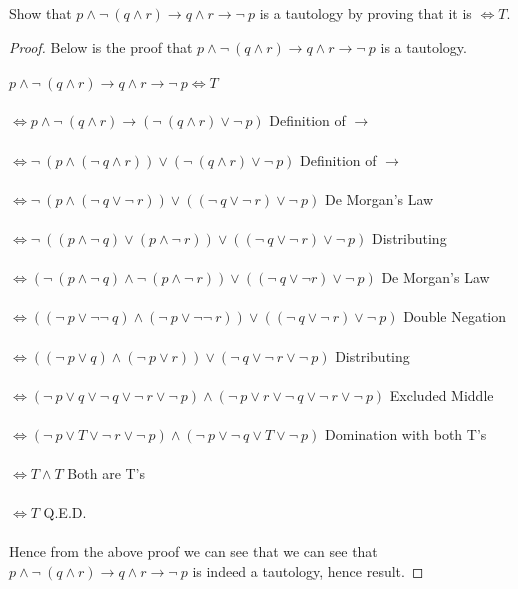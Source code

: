 \documentclass[12pt]{article}
\newenvironment{exercise}[2][Exercise]{\begin{trivlist}
\item[\hskip \labelsep {\bfseries #1}\hskip \labelsep {\bfseries #2.}]}{\end{trivlist}}
\begin{document}
\begin{exercise}{7}
Show that $p \land \neg\: (q \land r) \rightarrow q \land r \rightarrow \neg\: p$ is a tautology by proving that it is $\Leftrightarrow T$. 
\end{exercise}

\begin{proof} 
Below is the proof that $p \land \neg\: (q \land r) \rightarrow q \land r \rightarrow \neg\: p$ is a tautology. \\ \\
    $p \land \neg\: (q \land r) \rightarrow q \land r \rightarrow \neg\: p \Leftrightarrow T$ \hfill \\ \\
    $\Leftrightarrow p \land \neg\: (q \land r) \rightarrow (\neg\: (q \land r) \lor \neg\: p)$ \hfill Definition of $\rightarrow$ \\ \\ 
    $\Leftrightarrow \neg\: (p \land (\neg\: q \land r)) \lor (\neg\: (q \land r) \lor \neg\: p)$ \hfill Definition of $\rightarrow$ \\ \\ 
    $\Leftrightarrow \neg\: (p \land (\neg\: q \lor \neg\: r)) \lor ((\neg\: q \lor \neg\: r) \lor \neg\: p)$ \hfill De Morgan's Law \\ \\
    $\Leftrightarrow \neg\: ((p \land \neg\: q) \lor (p \land \neg\: r)) \lor ((\neg\: q \lor \neg\: r) \lor \neg\: p)$ \hfill Distributing \\ \\
    $\Leftrightarrow (\neg\: (p \land \neg\: q) \land \neg\:(p \land \neg\: r)) \lor ((\neg\: q \lor \neg r) \lor \neg\: p)$ \hfill De Morgan's Law \\ \\
    $\Leftrightarrow ((\neg\: p \lor \neg\neg\: q) \land (\neg\: p \lor \neg\neg\: r)) \lor ((\neg\: q \lor \neg\: r) \lor \neg\: p)$ \hfill Double Negation \\ \\ 
    $\Leftrightarrow ((\neg\: p \lor q) \land (\neg\: p \lor r)) \lor (\neg\: q \lor \neg\: r \lor \neg\: p)$ \hfill Distributing \\ \\ 
    $\Leftrightarrow (\neg\: p \lor q \lor \neg\: q \lor \neg\: r \lor \neg\: p) \land (\neg\: p \lor r \lor \neg\: q \lor \neg\: r \lor \neg\: p)$ \hfill Excluded Middle \\ \\ 
    $\Leftrightarrow (\neg\: p \lor T \lor \neg\: r \lor \neg\: p) \land (\neg\: p \lor \neg\: q \lor T \lor \neg\: p)$ \hfill Domination with both T's \\ \\
    $\Leftrightarrow T \land T$ \hfill Both are T's \\ \\
    $\Leftrightarrow T$ \hfill Q.E.D. \\ \\
    Hence from the above proof we can see that we can see that $p \land \neg\: (q \land r) \rightarrow q \land r \rightarrow \neg\: p$ is indeed a tautology, hence result. 
    
\end{proof}
\end{document}
